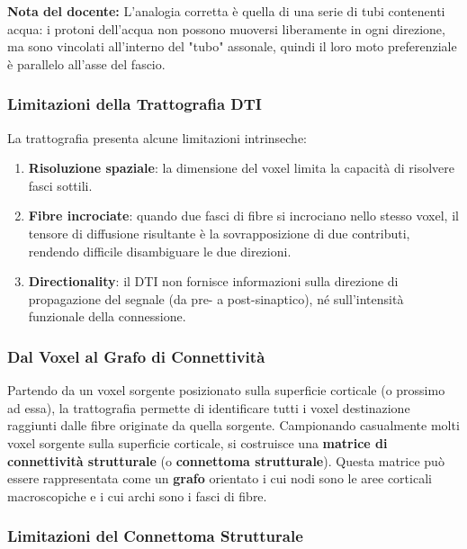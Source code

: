\begin{tcolorbox}[colback=gray!5, colframe=gray!40, arc=2mm, boxrule=0.5pt]
\textbf{Nota del docente:} L'analogia corretta è quella di una serie di tubi contenenti acqua: i protoni dell'acqua non possono muoversi liberamente in ogni direzione, ma sono vincolati all'interno del "tubo" assonale, quindi il loro moto preferenziale è parallelo all'asse del fascio.
\end{tcolorbox}

\subsubsection{Limitazioni della Trattografia DTI}

La trattografia presenta alcune limitazioni intrinseche:

\begin{enumerate}
    \item \textbf{Risoluzione spaziale}: la dimensione del voxel limita la capacità di risolvere fasci sottili.
    \item \textbf{Fibre incrociate}: quando due fasci di fibre si incrociano nello stesso voxel, il tensore di diffusione risultante è la sovrapposizione di due contributi, rendendo difficile disambiguare le due direzioni.
    \item \textbf{Directionality}: il DTI non fornisce informazioni sulla direzione di propagazione del segnale (da pre- a post-sinaptico), né sull'intensità funzionale della connessione.
\end{enumerate}


\subsubsection{Dal Voxel al Grafo di Connettività}

Partendo da un voxel sorgente posizionato sulla superficie corticale (o prossimo ad essa), la trattografia permette di identificare tutti i voxel destinazione raggiunti dalle fibre originate da quella sorgente. Campionando casualmente molti voxel sorgente sulla superficie corticale, si costruisce una \textbf{matrice di connettività strutturale} (o \textbf{connettoma strutturale}). Questa matrice può essere rappresentata come un \textbf{grafo} orientato i cui nodi sono le aree corticali macroscopiche e i cui archi sono i fasci di fibre.

\subsubsection{Limitazioni del Connettoma Strutturale}

